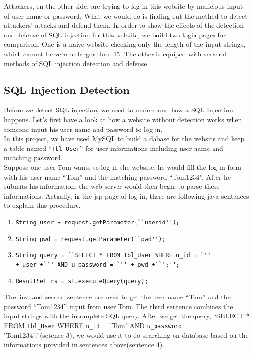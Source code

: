 \documentclass[12pt]{article}
\begin{document}
Attackers, on the other side, are trying to log in this website by malicious input of user name or password. What we would do is finding out the method to detect attackers' attacks and defend them. In order to show the effects of the detection and defense of SQL injection for this website, we build two login pages for comparison. One is a naive website checking only the length of the input strings, which cannot be zero or larger than 15. The other is equiped with serveral methods of SQL injection detection and defense.\\

\subsection{SQL Injection Detection}

Before we detect SQL injection, we need to understand how a SQL Injection happens. Let's first have a look at how a website without detection works when someone input his user name and password to log in.\\

In this project, we have used MySQL to build a dabase for the website and keep a table named ``\verb"Tbl_User"'' for user informations including user name and matching password.\\

Suppose one user Tom wants to log in the website, he would fill the log in form with his user name ``Tom'' and the matching password ``Tom1234''. After he submits his information, the web server would then begin to parse these informations. Actually, in the jsp page of log in, there are following java sentences to explain this procedure. \\

\begin{enumerate}
\item \verb"String user = request.getParameter(``userid'');"
\item \verb"String pwd = request.getParameter(``pwd'');"
\item \verb"String query = ``SELECT * FROM Tbl_User WHERE u_id = `''"\\
      \verb"+ user +``' AND u_password = `'' + pwd +``';'';"
\item \verb"ResultSet rs = st.executeQuery(query);"
\end{enumerate} 

The first and second sentence are used to get the user name ``Tom'' and the password ``Tom1234'' input from user Tom. The third sentence combines the input strings with the incomplete SQL query. After we get the query, ``SELECT * FROM \verb"Tbl_User" WHERE \verb"u_id" = 'Tom' AND \verb"u_password" = 'Tom1234';''(setence 3), we would use it to do searching on database based on the informations provided in sentences above(sentence 4).\\
\end{document}
